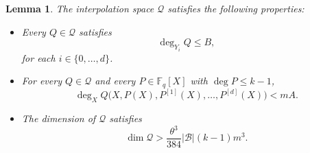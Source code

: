 \documentclass[11pt]{article}
\newtheorem{lemma}[theorem]{Lemma}
\begin{document}
\begin{lemma}\label{lem:global-budgets}
The interpolation space $\mathcal Q$ satisfies the following properties:
\begin{itemize}
    \item Every $Q\in\mathcal Q$ satisfies
    \[
    \deg_{Y_i}Q
    \le B,
    \]
    for each $i \in \{0,\ldots, d\}$.
    \item For every $Q\in\mathcal Q$ and every
    $P\in\mathbb F_q[X]$ with $\deg P\le k-1$,
    \[
    \deg_X
    Q\bigl(X,P(X),P^{[1]}(X),\ldots,P^{[d]}(X)\bigr)
    <mA.
    \]

    \item The dimension of $\mathcal Q$ satisfies
    \[
    \dim\mathcal Q
    >
    \frac{\theta^3}{384}
    |\mathcal B|(k-1)m^3.
    \]
\end{itemize}
\end{lemma}
\end{document}

